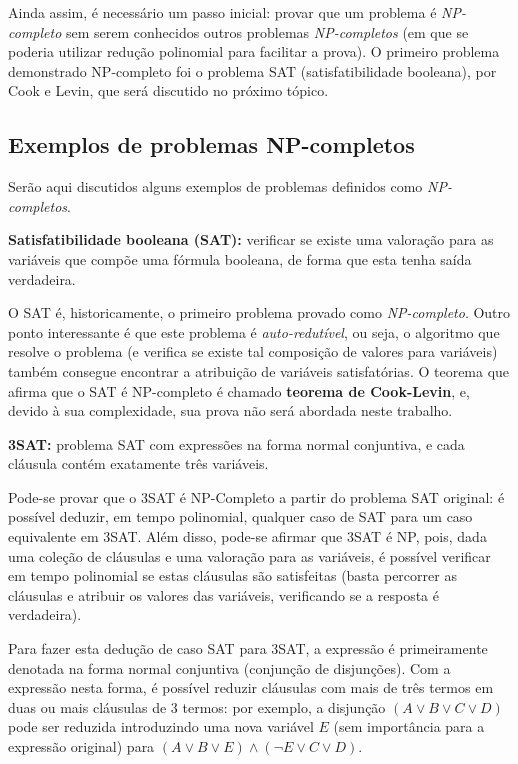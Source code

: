 Ainda assim, é necessário um passo inicial: provar que um problema é \textit{NP-completo} sem serem conhecidos outros problemas \textit{NP-completos} (em que se poderia utilizar redução polinomial para facilitar a prova). O primeiro problema demonstrado NP-completo foi o problema SAT (satisfatibilidade booleana), por Cook e Levin, que será discutido no próximo tópico.

\subsection{Exemplos de problemas NP-completos}

Serão aqui discutidos alguns exemplos de problemas definidos como \textit{NP-completos}.


\begin{trivlist}
\item \textbf{Satisfatibilidade booleana (SAT):} verificar se existe uma valoração para as variáveis que compõe uma fórmula booleana, de forma que esta tenha saída verdadeira.
\end{trivlist}

O SAT é, historicamente, o primeiro problema provado como \textit{NP-completo}. Outro ponto interessante é que este problema é \textit{auto-redutível}, ou seja, o algoritmo que resolve o problema (e verifica se existe tal composição de valores para variáveis) também consegue encontrar a atribuição de variáveis satisfatórias. O teorema que afirma que o SAT é NP-completo é chamado \textbf{teorema de Cook-Levin}, e, devido à sua complexidade, sua prova não será abordada neste trabalho.

\begin{trivlist}
\item \textbf{3SAT:} problema SAT com expressões na forma normal conjuntiva, e cada cláusula contém exatamente três variáveis.
\end{trivlist}

Pode-se provar que o 3SAT é NP-Completo a partir do problema SAT original: é possível deduzir, em tempo polinomial, qualquer caso de SAT para um caso equivalente em 3SAT. Além disso, pode-se afirmar que 3SAT é NP, pois, dada uma coleção de cláusulas e uma valoração para as variáveis, é possível verificar em tempo polinomial se estas cláusulas são satisfeitas (basta percorrer as cláusulas e atribuir os valores das variáveis, verificando se a resposta é verdadeira).

Para fazer esta dedução de caso SAT para 3SAT, a expressão é primeiramente denotada na forma normal conjuntiva (conjunção de disjunções). Com a expressão nesta forma, é possível reduzir cláusulas com mais de três termos em duas ou mais cláusulas de 3 termos: por exemplo, a disjunção $(A \lor B \lor C \lor D)$ pode ser reduzida introduzindo uma nova variável $E$ (sem importância para a expressão original) para $(A \lor B \lor E) \wedge (\neg E \lor C \lor D)$.

